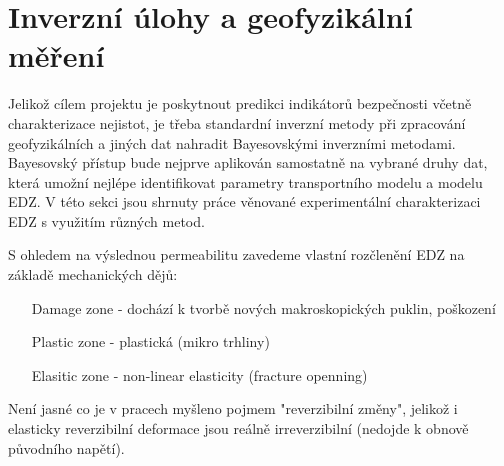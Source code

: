 \documentclass{article}
\begin{document}
% 
% 
% 
% 
% 
% 
% 
% 


\section{Inverzní úlohy a geofyzikální měření}
\label{sec:inverse_problems}

Jelikož cílem projektu je poskytnout predikci indikátorů bezpečnosti 
včetně charakterizace nejistot, je třeba standardní inverzní metody při zpracování geofyzikálních a jiných dat nahradit Bayesovskými inverzními metodami. Bayesovský přístup bude nejprve aplikován samostatně na vybrané druhy dat, která umožní nejlépe identifikovat parametry transportního modelu a modelu EDZ. V této sekci jsou shrnuty práce věnované experimentální charakterizaci EDZ s využitím různých metod.

S ohledem na výslednou permeabilitu zavedeme vlastní rozčlenění EDZ na základě mechanických dějů:
\begin{itemize}
    \item [Damage zone] - dochází k tvorbě nových makroskopických puklin, poškození
    \item [Plastic zone] - plastická (mikro trhliny)
    \item [Elasitic zone] - non-linear elasticity (fracture openning)
\end{itemize}
Není jasné co je v pracech myšleno pojmem "reverzibilní změny", jelikož i elasticky reverzibilní deformace jsou reálně irreverzibilní (nedojde k obnově původního napětí).
\end{document}
